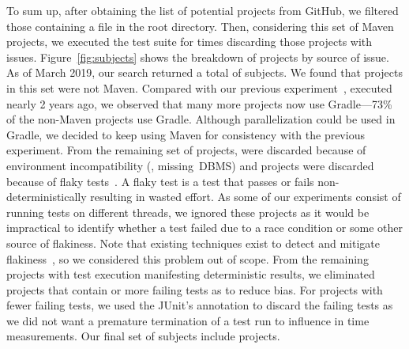 \documentclass[10pt,journal,compsoc]{IEEEtran}
\begin{document}
To sum up, after obtaining the list of potential projects from GitHub,
we filtered those containing a \pomf{} file in the root
directory.  Then, considering this set of Maven
projects, we executed the test suite for \SubjectsReruns{} times
discarding those projects with issues. Figure~\ref{fig:subjects}
shows the breakdown of projects by source of issue. As of
March 2019, our search returned a total of \SubjectsGithub{}
subjects.  We found that \SubjectsGithubNotMaven{}
projects in this set were not Maven. Compared with our previous
experiment~\cite{Candido:2017:TSP:3155562.3155667}, executed nearly 2
years ago, we observed  that many more
projects now use Gradle---73\% of the \SubjectsGithubNotMaven{} non-Maven
projects use Gradle. Although parallelization could
be used in Gradle, we decided to keep using Maven for
consistency with the previous experiment. From the remaining set of
projects, \SubjectsGithubNotTestable{} were discarded
because of environment incompatibility (\eg, missing~DBMS) and
\SubjectsGithubFlaky{} projects were discarded because of flaky
tests~\cite{luo-etal-fse2014}. A flaky test is a test that passes or
fails non-deterministically resulting in wasted effort.  As some of our experiments consist of running tests on
different threads, we ignored these projects as it would be
impractical to identify whether a test failed due to a race condition
or some other source of flakiness. Note that existing techniques exist to
detect and mitigate flakiness~, so we considered this
problem out of scope. From the remaining
\SubjectsGithubConsistant{} projects with test execution
manifesting deterministic results, we
eliminated \SubjectsGithubTooManyFailures{} projects that contain
\SuiteFailingThreshold{} or more failing tests as to reduce
bias. For projects with fewer failing tests, we used the JUnit's
 annotation to discard the failing tests as we did not
want a premature termination of a test run to influence in time measurements.  Our final set of
subjects include  \numSubjs{} projects. 



\end{document}
